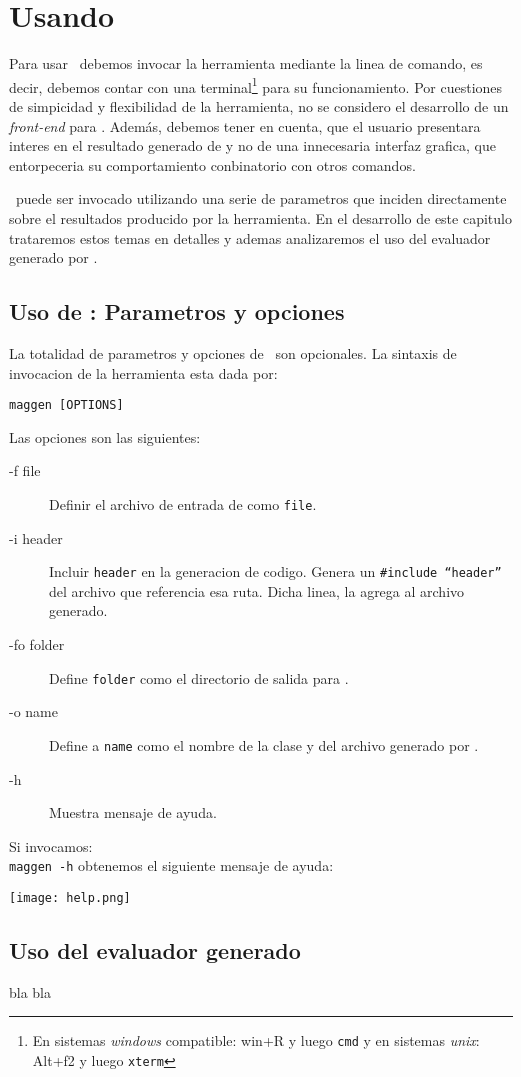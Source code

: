 \chapter{Usando \maggen}
\label{chap:usos}
\minitoc
Para usar \maggen\ debemos invocar la herramienta mediante la linea de comando, es decir, debemos contar con una terminal\footnote{En sistemas \textit{windows} compatible: win+R y luego \texttt{cmd} y en sistemas \textit{unix}: Alt+f2 y luego \texttt{xterm}} para su funcionamiento. Por cuestiones de simpicidad y flexibilidad de la herramienta, no se considero el desarrollo de un \textit{front-end} para \maggen. Además, debemos tener en cuenta, que el usuario presentara interes en el resultado generado de \maggen y no de una innecesaria interfaz grafica, que entorpeceria su comportamiento conbinatorio con otros comandos.
  
\maggen\ puede ser invocado utilizando una serie de parametros que inciden directamente sobre el resultados producido por la herramienta. En el desarrollo de este capitulo trataremos estos temas en detalles y ademas analizaremos el uso del evaluador generado por \maggen.

\section{Uso de \maggen: Parametros y opciones}
La totalidad de parametros y opciones de \maggen\ son opcionales. La sintaxis de invocacion de la herramienta esta dada por:\\
\begin{center}\texttt{maggen [OPTIONS]}\end{center}
Las opciones son las siguientes:
\begin{description}
\item [-f  file] Definir el archivo de entrada de \maggen como \texttt{file}.
\item [-i  header] Incluir \texttt{header} en la generacion de codigo. Genera un \texttt{\#include ``header''} del archivo que referencia esa ruta. Dicha linea, \maggen la agrega al archivo generado.
\item [-fo folder] Define \texttt{folder} como el directorio de salida para \maggen.
\item [-o  name] Define a \texttt{name} como el nombre de la clase y del archivo generado por \maggen.
\item [-h] Muestra mensaje de ayuda.
\end{description}

Si invocamos:\\\texttt{maggen -h} obtenemos el siguiente mensaje de ayuda:
\begin{center}
\texttt{[image: help.png]}
\end{center}
 

\section{Uso del evaluador generado}
bla bla